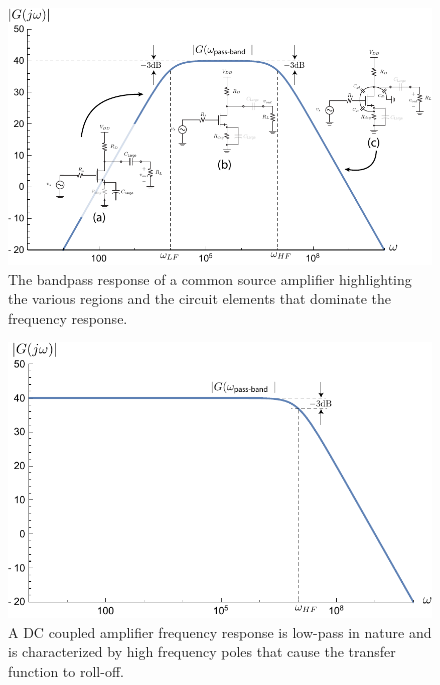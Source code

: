 \newpage
\begin{figure}[t]
\centering
\includegraphics[width=\columnwidth]{amp_bandpass_decorate} 
\caption{The bandpass response of a common source amplifier highlighting the various regions and the circuit elements that dominate the frequency response.}
\label{fig:amp_bandpass}
\end{figure}
\begin{figure}[H]
\centering
\includegraphics[width=.75\columnwidth]{amp_dccoup} 
\caption{A DC coupled amplifier frequency response is low-pass in nature and is characterized by high frequency poles that cause the transfer function to roll-off.}
\label{fig:amp_dccoup}
\end{figure}
